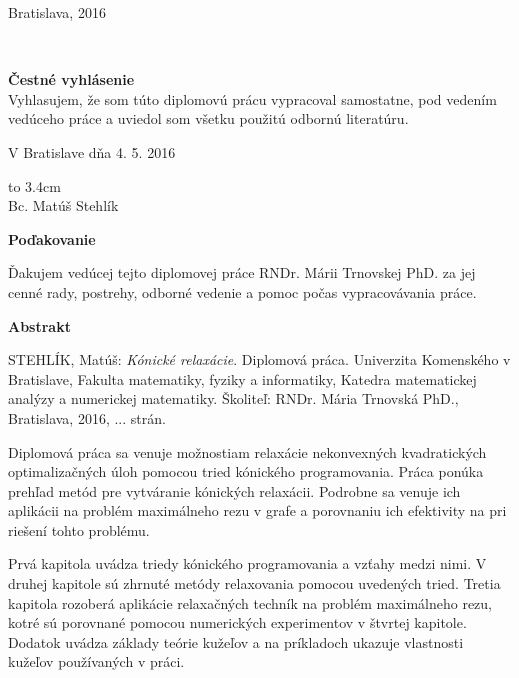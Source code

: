 \documentclass[12pt]{book}
\theoremstyle{definition}
\def\mfplacedate{Bratislava, 2016}
\begin{document}
\hfill\mfplacedate
\eject %






\eject %

{~}\vspace{12cm}

\noindent
\begin{minipage}{1\textwidth}
{\bf Čestné vyhlásenie} \\
Vyhlasujem, že som túto diplomovú prácu vypracoval samostatne, pod vedením vedúceho práce a uviedol som všetku použitú odbornú literatúru.\\

\medskip

V Bratislave dňa 4. 5. 2016

\bigskip\bigskip

\hfill\hbox to 3.4cm{\dotfill} \\
\medskip
\hfill{Bc. Matúš Stehlík}\\ 
\end{minipage}
\vfill\null\eject %

{\large\bf Poďakovanie}

\medskip

Ďakujem vedúcej tejto diplomovej práce RNDr. Márii Trnovskej PhD. za jej cenné rady, postrehy, odborné vedenie a pomoc počas vypracovávania práce.

\vfill\null\eject


{\large\bf Abstrakt}

\medskip

STEHLÍK, Matúš: {\it Kónické relaxácie}. Diplomová práca. Univerzita Komenského v Bratislave, Fakulta matematiky, fyziky a informatiky, Katedra matematickej analýzy a numerickej matematiky. Školiteľ: RNDr. Mária Trnovská PhD., Bratislava, 2016, ... strán.

\bigskip

Diplomová práca sa venuje možnostiam relaxácie nekonvexných kvadratických optimalizačných úloh pomocou tried kónického programovania. Práca ponúka prehľad metód pre vytváranie kónických relaxácii. Podrobne sa venuje ich aplikácii na problém maximálneho rezu v grafe a porovnaniu ich efektivity na pri riešení tohto problému.


Prvá kapitola uvádza triedy kónického programovania a vzťahy medzi nimi. V druhej kapitole sú zhrnuté metódy relaxovania pomocou uvedených tried. Tretia kapitola rozoberá aplikácie relaxačných techník na problém maximálneho rezu, kotré sú porovnané pomocou numerických experimentov v štvrtej kapitole. Dodatok uvádza základy teórie kužeľov a na príkladoch ukazuje vlastnosti kužeľov používaných v práci.
\end{document}
